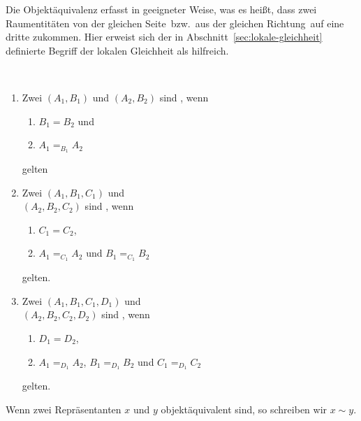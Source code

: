     
    Die Objektäquivalenz erfasst in geeigneter Weise, was es heißt, dass zwei Raumentitäten \glqq von der gleichen Seite\grqq\ bzw.\ \glqq aus der gleichen Richtung\grqq\ auf eine dritte zukommen. 
    Hier erweist sich der in Abschnitt~\ref{sec:lokale-gleichheit} definierte Begriff der lokalen Gleichheit als hilfreich.

    \begin{dfn}\label{dfn:objektaequivalenz}\ \vspace{0pt}

        \begin{enumerate}
            \item Zwei  $(A_1,B_1)$ und $(A_2,B_2)$ sind , wenn 
                \begin{enumerate}
                    \item $B_1 = B_2$ und
                    \item $A_1 =_{B_1} A_2$
                \end{enumerate}
                gelten
            \item Zwei  $(A_1,B_1,C_1)$ und \\
            $(A_2,B_2,C_2)$ sind , wenn 
                \begin{enumerate}
                    \item $C_1 = C_2$,
                    \item $A_1 =_{C_1} A_2$ und $B_1 =_{C_1} B_2$
                \end{enumerate}
                gelten.
            \item Zwei  $(A_1,B_1,C_1,D_1)$ und\\
                $(A_2,B_2,C_2,D_2)$ sind , wenn 
                \begin{enumerate}
                    \item $D_1 = D_2$,
                    \item $A_1 =_{D_1} A_2$, $B_1 =_{D_1} B_2$ und $C_1 =_{D_1} C_2$
                \end{enumerate}	
                gelten.		
        \end{enumerate}
        
        Wenn zwei Repräsentanten $x$ und $y$ objektäquivalent sind, so schreiben wir $x \sim y$.
        
    \end{dfn}
    
